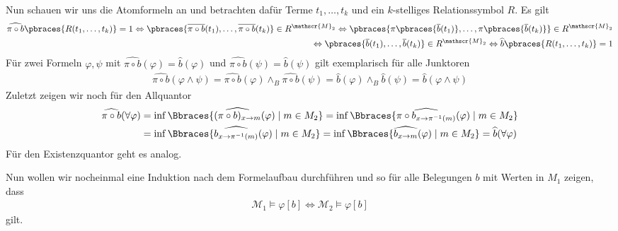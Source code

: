 \begin{solution}
	Nun schauen wir uns die Atomformeln an und betrachten dafür Terme $t_1, \dots, t_k$ und ein $k$-stelliges Relationssymbol $R$. Es gilt
	\begin{align*}
	\widehat{\pi \circ b}\pbraces{R(t_1, \dots, t_k)} = 1 \Leftrightarrow \pbraces{\overline{\pi \circ b}(t_1), \dots, \overline{\pi \circ b}(t_k)} \in R^{\mathscr{M}_2} \Leftrightarrow \pbraces{\pi\pbraces{\overline{b}(t_1)}, \dots, \pi \pbraces{\overline{b}(t_k)}} \in R^{\mathscr{M}_2} \\
	\Leftrightarrow \pbraces{\overline{b}(t_1), \dots, \overline{b}(t_k)} \in R^{\mathscr{M}_2} \Leftrightarrow \widehat{b}\pbraces{R(t_1, \dots, t_k)} = 1
	\end{align*}
	Für zwei Formeln $\varphi, \psi$ mit $\widehat{\pi \circ b}(\varphi) = \widehat{b}(\varphi)$ und $\widehat{\pi \circ b}(\psi) = \widehat{b}(\psi)$ gilt exemplarisch für alle Junktoren
	\begin{align*}
	\widehat{\pi \circ b}(\varphi \land \psi) = \widehat{\pi \circ b}(\varphi) \land_B \widehat{\pi \circ b}(\psi) = \widehat{b}(\varphi) \land_B \widehat{b}(\psi) = \widehat{b}(\varphi \land \psi)
	\end{align*}
	Zuletzt zeigen wir noch für den Allquantor
	\begin{align*}
	\widehat{\pi \circ b}(\forall \varphi) &= \inf\Bbraces{\widehat{(\pi \circ b)_{x \to m}}(\varphi) \mid m \in M_2} = \inf\Bbraces{\widehat{\pi \circ b_{x \to \pi^{-1}(m)}}(\varphi) \mid m \in M_2} \\
	&= \inf\Bbraces{\widehat{b_{x \to \pi^{-1}(m)}}(\varphi) \mid m \in M_2} = \inf\Bbraces{\widehat{b_{x \to m}}(\varphi) \mid m \in M_2} = \widehat{b}(\forall \varphi)
	\end{align*}
	Für den Existenzquantor geht es analog.

	Nun wollen wir nocheinmal eine Induktion nach dem Formelaufbau durchführen und so für alle Belegungen $b$ mit Werten in $M_1$ zeigen, dass
	\begin{align*}
	\mathscr{M}_1 \vDash \varphi[b] \iff \mathscr{M}_2 \vDash \varphi[b]
	\end{align*}
	gilt.


\end{solution}
